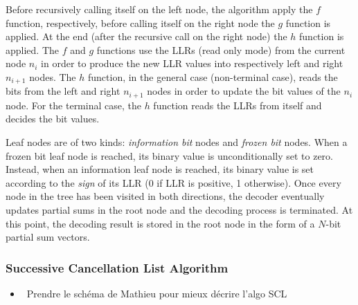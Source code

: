 Before recursively calling itself on the left node, the algorithm apply the $f$
function, respectively, before calling itself on the right node the $g$ function
is applied. At the end (after the recursive call on the right node) the $h$
function is applied. The $f$ and $g$ functions use the LLRs (read only mode)
from the current node $n_i$ in order to produce the new LLR values into
respectively left and right $n_{i+1}$ nodes. The $h$ function, in the general
case (non-terminal case), reads the bits from the left and right $n_{i+1}$ nodes
in order to update the bit values of the $n_i$ node. For the terminal case, the
$h$ function reads the LLRs from itself and decides the bit values.

Leaf nodes are of two kinds: \emph{information bit} nodes and \emph{frozen bit}
nodes. When a frozen bit leaf node is reached, its binary value is
unconditionally set to zero. Instead, when an information leaf node is reached,
its binary value is set according to the \emph{sign} of its LLR (0 if LLR is
positive, 1 otherwise). Once every node in the tree has been visited in both
directions, the decoder eventually updates partial sums in the root node and the
decoding process is terminated. At this point, the decoding result is stored in
the root node in the form of a $N$-bit partial sum vectors.

\subsubsection{Successive Cancellation List Algorithm}

\begin{itemize}
  \item \xmark~Prendre le schéma de Mathieu pour mieux décrire l'algo SCL
\end{itemize}

